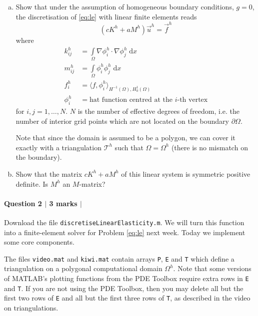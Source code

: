 \documentclass[10pt,letterpaper]{scrartcl}
\newcommand{\dx}{\;\mathrm{d}x}
\begin{document}
\begin{enumerate}[(a)]
\item Show that under the assumption of homogeneous boundary conditions, $g=0$, the discretisation of \eqref{eq:le} with linear finite elements reads
\begin{equation*}
(cK^h + aM^h) \vec{u}^h = \vec{f}^h
\end{equation*}
where
\begin{align*}
k_{ij}^h &= \int\limits_\Omega \nabla \phi_i^h \cdot \nabla \phi_j^h \dx\\
m_{ij}^h &= \int\limits_\Omega \phi_i^h \phi_j^h \dx\\
f_{i}^h &= \langle f, \phi_i^h\rangle_{H^{-1}(\Omega),H^1_0(\Omega)}\\
\phi_i^h &= \text{hat function centred at the $i$-th vertex}
\end{align*}
for $i,j = 1,\dots ,N$. $N$ is the number of effective degrees of freedom, i.e. the number of interior grid points which are not located on the boundary $\partial\Omega$.

Note that since the domain is assumed to be a polygon, we can cover it exactly with a triangulation $\mathcal{T}^h$ such that $\Omega = \Omega^h$ (there is no mismatch on the boundary).

\newpage

\mbox{}

\newpage
\item Show that the matrix $cK^h + aM^h$ of this linear system is symmetric positive definite. Is $M^h$ an $M$-matrix?
\end{enumerate}
\newpage

\paragraph*{Question 2 $\vert$ 3 marks $\vert$ \faFileCodeO}

Download the file \texttt{discretiseLinearElasticity.m}. We will turn this function into a finite-element solver for Problem \eqref{eq:le} next week. Today we implement some core components.

The files \texttt{video.mat} and \texttt{kiwi.mat} contain arrays \texttt{P}, \texttt{E} and \texttt{T} which define a triangulation on a polygonal computational domain $\Omega^h$. Note that some versions of \textsf{MATLAB}'s plotting functions from the PDE Toolbox require extra rows in \texttt{E} and \texttt{T}. If you are not using the PDE Toolbox, then you may delete all but the first two rows of \texttt{E} and all but the first three rows of \texttt{T}, as described in the video on triangulations.
\end{document}
